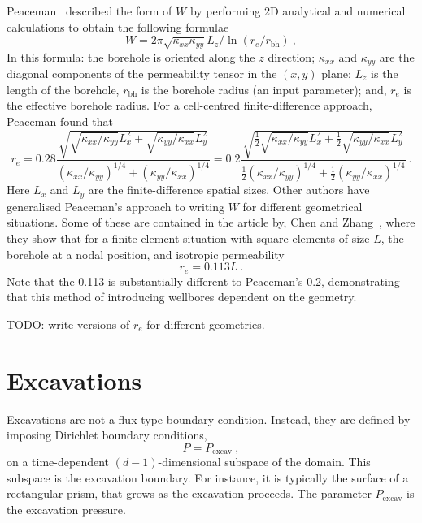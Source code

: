 \documentclass[]{scrreprt}
\begin{document}
Peaceman~\cite{peaceman1983} described the form of $W$ by performing
2D analytical and numerical calculations to obtain the following
formulae
\begin{equation}
W = 2\pi \sqrt{\kappa_{xx}\kappa_{yy}}L_{z}/\ln(r_{e}/r_{\mathrm{bh}})
\ ,
\end{equation}
In this formula: the borehole is oriented along the $z$ direction;
$\kappa_{xx}$ and $\kappa_{yy}$ are the diagonal components of the
permeability tensor in the $(x,y)$ plane; $L_{z}$ is the length of the borehole,
$r_{\mathrm{bh}}$ is the borehole radius (an input parameter); and,
$r_{e}$ is the effective borehole radius.  For a cell-centred
finite-difference approach, Peaceman found that
\begin{equation}
r_{e} = 0.28 \frac{\sqrt{\sqrt{\kappa_{xx}/\kappa_{yy}}L_{x}^{2} +
    \sqrt{\kappa_{yy}/\kappa_{xx}}L_{y}^{2}}}{(\kappa_{xx}/\kappa_{yy})^{1/4}
  + (\kappa_{yy}/\kappa_{xx})^{1/4}}
= 0.2 \frac{\sqrt{\mbox{$\frac{1}{2}$}\sqrt{\kappa_{xx}/\kappa_{yy}}L_{x}^{2} +
    \mbox{$\frac{1}{2}$}\sqrt{\kappa_{yy}/\kappa_{xx}}L_{y}^{2}}}{\mbox{$\frac{1}{2}$}(\kappa_{xx}/\kappa_{yy})^{1/4}
  + \mbox{$\frac{1}{2}$}(\kappa_{yy}/\kappa_{xx})^{1/4}} \ .
\end{equation}
Here $L_{x}$ and $L_{y}$ are the finite-difference spatial sizes.
Other authors have generalised Peaceman's approach to writing $W$ for
different geometrical situations.  Some of these are contained in the
article by, Chen and Zhang~\cite{chen2009}, where they show that for a
finite element situation with square elements of size $L$, the
borehole at a nodal position, and isotropic permeability
\begin{equation}
r_{e} =  0.113L \ .
\end{equation}
Note that the 0.113 is substantially different to Peaceman's 0.2,
demonstrating that this method of introducing wellbores dependent on
the geometry.

TODO: write versions of $r_{e}$ for different geometries.




\section{Excavations}

Excavations are not a flux-type boundary condition.  Instead, they are
defined by imposing Dirichlet boundary conditions,
\begin{equation}
P = P_{\mathrm{excav}} \ ,
\end{equation}
on a time-dependent $(d-1)$-dimensional subspace of the domain.  This
subspace is the excavation boundary.  For instance, it is typically
the surface of a rectangular prism, that grows as the excavation
proceeds.  The parameter $P_{\mathrm{excav}}$ is the excavation
pressure.
\end{document}
